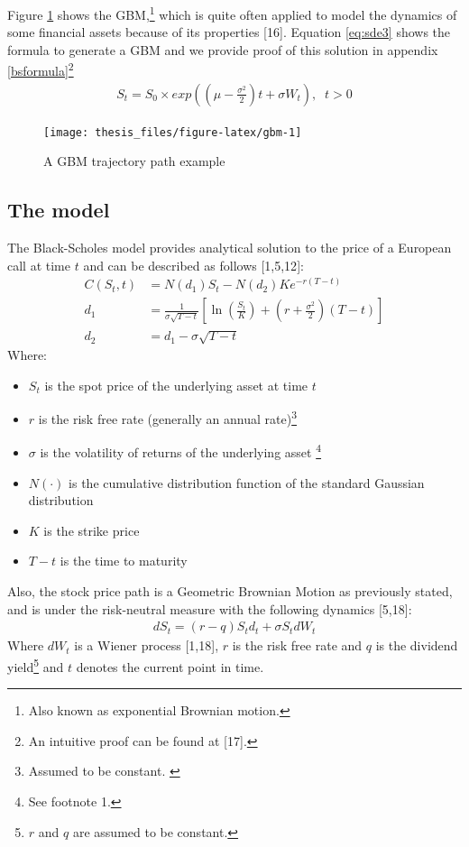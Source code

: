\documentclass[12pt,twoside]{reedthesis}
\providecommand{\tightlist}{%
  \setlength{\itemsep}{0pt}\setlength{\parskip}{0pt}}
\theoremstyle{definition}
\theoremstyle{definition}
\theoremstyle{remark}
\begin{document}
  Figure \ref{fig:gbm} shows the GBM,\footnote{Also known as exponential
    Brownian motion.} which is quite often applied to model the dynamics
  of some financial assets because of its properties {[}16{]}. Equation
  \eqref{eq:sde3} shows the formula to generate a GBM and we provide proof
  of this solution in appendix \ref{bsformula}\footnote{An intuitive proof
    can be found at {[}17{]}.}
  \begin{align} \label{eq:sde3}
  S_t = S_0 \times exp{\left( \left( \mu - \frac{\sigma^2}{2} \right) t + \sigma W_t \right)}, \;\; t > 0
  \end{align}
  \begin{figure}
  
  {\centering \texttt{[image: thesis\_files/figure-latex/gbm-1]} 
  
  }
  
  \caption{A GBM trajectory path example \label{gbm}}\label{fig:gbm}
  \end{figure}
  \subsection{The model}\label{the-model}
  
  The Black-Scholes model provides analytical solution to the price of a
  European call at time \(t\) and can be described as follows
  {[}1,5,12{]}:
  \begin{align}
  C(S_{t},t)&=N(d_{1})S_{t}-N(d_{2})Ke^{-r(T-t)}\\[10pt]
  d_{1}&={\frac {1}{\sigma {\sqrt {T-t}}}}\left[\ln \left({\frac {S_{t}}{K}}\right)+\left(r+{\frac {\sigma ^{2}}{2}}\right)(T-t)\right]\\[10pt]
  d_{2}&=d_{1}-\sigma {\sqrt {T-t}}
  \end{align}
  \noindent
  Where:
  \begin{itemize}
  \tightlist
  \item
    \(S_{t}\) is the spot price of the underlying asset at time \(t\)
  \item
    \(r\) is the risk free rate (generally an annual
    rate)\footnote{Assumed to be constant. \label{teste}}
  \item
    \(\sigma\) is the volatility of returns of the underlying asset
    \footnote{See footnote 1.}
  \item
    \(N(\cdot )\) is the cumulative distribution function of the standard
    Gaussian distribution
  \item
    \(K\) is the strike price
  \item
    \(T-t\) is the time to maturity
  \end{itemize}
  \noindent
  Also, the stock price path is a Geometric Brownian Motion as previously
  stated, and is under the risk-neutral measure with the following
  dynamics {[}5,18{]}:
  \begin{align}
  dS_{t} = (r-q)S_td_t+\sigma S_t dW_t
  \end{align}
  \noindent
  Where \(dW_t\) is a Wiener process {[}1,18{]}, \(r\) is the risk free
  rate and \(q\) is the dividend
  yield\footnote{$r$ and $q$ are assumed to be constant.} and \(t\)
  denotes the current point in time.
  
\end{document}

